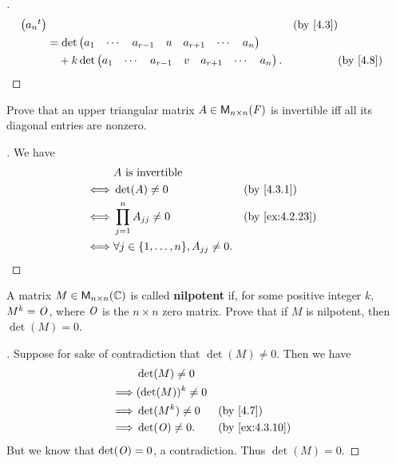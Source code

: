 \begin{proof}[]
\begin{align*}
\begin{pmatrix}
			                                      \tp{a_n}
		                                      \end{pmatrix}                         &  & \by{4.3} \\
		        & = \det\begin{pmatrix}
			                a_1 & \cdots & a_{r - 1} & u & a_{r + 1} & \cdots & a_n
		                \end{pmatrix}                   \\
		        & \quad + k \det\begin{pmatrix}
			                        a_1 & \cdots & a_{r - 1} & v & a_{r + 1} & \cdots & a_n
		                        \end{pmatrix}.      &  & \by{4.8}
	\end{align*}
\end{proof}

\begin{ex}\label{ex:4.3.9}
	Prove that an upper triangular matrix \(A \in \ms[n][n][\F]\) is invertible iff all its diagonal entries are nonzero.
\end{ex}

\begin{proof}[]
	We have
	\begin{align*}
		     & A \text{ is invertible}                                              \\
		\iff & \det(A) \neq 0                                   &  & \by{4.3.1}     \\
		\iff & \prod_{j = 1}^n A_{j j} \neq 0                   &  & \by{ex:4.2.23} \\
		\iff & \forall j \in \set{1, \dots, n}, A_{j j} \neq 0.
	\end{align*}
\end{proof}

\begin{ex}\label{ex:4.3.10}
	A matrix \(M \in \ms[n][n][\C]\) is called \textbf{nilpotent} if, for some positive integer \(k\), \(M^k = \mathit{O}\), where \(\mathit{O}\) is the \(n \times n\) zero matrix.
	Prove that if \(M\) is nilpotent, then \(\det(M) = 0\).
\end{ex}

\begin{proof}[]
	Suppose for sake of contradiction that \(\det(M) \neq 0\).
	Then we have
	\begin{align*}
		         & \det(M) \neq 0                         \\
		\implies & (\det(M))^k \neq 0                     \\
		\implies & \det(M^k) \neq 0   &  & \by{4.7}       \\
		\implies & \det(\zm) \neq 0.  &  & \by{ex:4.3.10}
	\end{align*}
	But we know that \(\det(\mathit{O}) = 0\), a contradiction.
	Thus \(\det(M) = 0\).
\end{proof}

